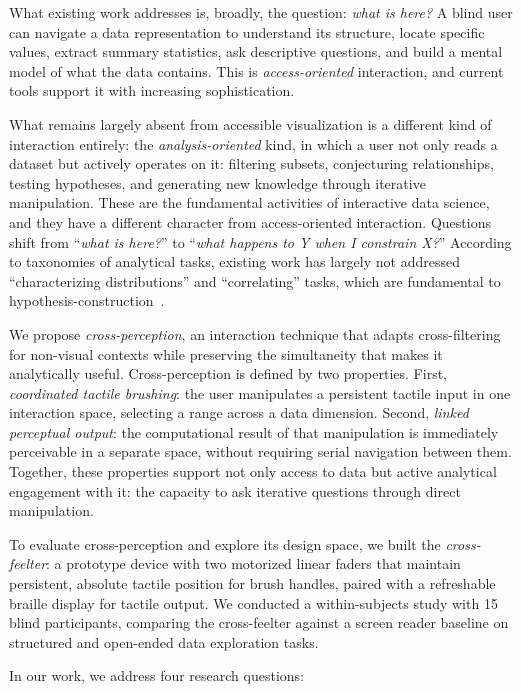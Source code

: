 \documentclass[12pt]{cmuthesis}
\begin{document}
What existing work addresses is, broadly, the question: \textit{what is here?} A blind user can navigate a data representation to understand its structure, locate specific values, extract summary statistics, ask descriptive questions, and build a mental model of what the data contains. This is \textit{access-oriented} interaction, and current tools support it with increasing sophistication.

What remains largely absent from accessible visualization is a different kind of interaction entirely: the \textit{analysis-oriented} kind, in which a user not only reads a dataset but actively operates on it: filtering subsets, conjecturing relationships, testing hypotheses, and generating new knowledge through iterative manipulation. These are the fundamental activities of interactive data science, and they have a different character from access-oriented interaction. Questions shift from ``\textit{what is here?}'' to ``\textit{what happens to Y when I constrain X?}'' According to taxonomies of analytical tasks, existing work has largely not addressed ``characterizing distributions'' and ``correlating'' tasks, which are fundamental to hypothesis-construction~\cite{Amar2005}.

We propose \textit{cross-perception}, an interaction technique that adapts cross-filtering for non-visual contexts while preserving the simultaneity that makes it analytically useful. Cross-perception is defined by two properties. First, \textit{coordinated tactile brushing}: the user manipulates a persistent tactile input in one interaction space, selecting a range across a data dimension. Second, \textit{linked perceptual output}: the computational result of that manipulation is immediately perceivable in a separate space, without requiring serial navigation between them. Together, these properties support not only access to data but active analytical engagement with it: the capacity to ask iterative questions through direct manipulation.

To evaluate cross-perception and explore its design space, we built the \textit{cross-feelter}: a prototype device with two motorized linear faders that maintain persistent, absolute tactile position for brush handles, paired with a refreshable braille display for tactile output. We conducted a within-subjects study with 15 blind participants, comparing the cross-feelter against a screen reader baseline on structured and open-ended data exploration tasks.

In our work, we address four research questions:
\end{document}
